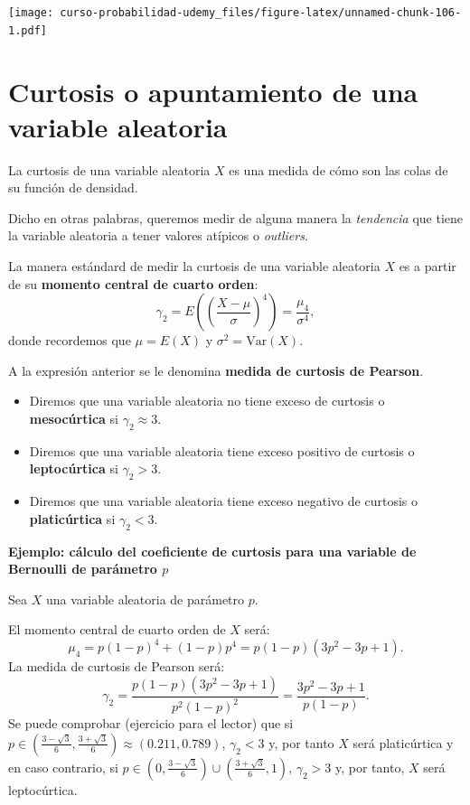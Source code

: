 \documentclass[]{book}
\begin{document}
\texttt{[image: curso-probabilidad-udemy\_files/figure-latex/unnamed-chunk-106-1.pdf]}

\hypertarget{curtosis-o-apuntamiento-de-una-variable-aleatoria}{%
\section{Curtosis o apuntamiento de una variable aleatoria}\label{curtosis-o-apuntamiento-de-una-variable-aleatoria}}

La curtosis de una variable aleatoria \(X\) es una medida de cómo son las colas de su función de densidad.

Dicho en otras palabras, queremos medir de alguna manera la \emph{tendencia} que tiene la variable aleatoria a tener valores atípicos o \emph{outliers}.

La manera estándard de medir la curtosis de una variable aleatoria \(X\) es a partir de su \textbf{momento central de cuarto orden}:
\[
\gamma_2 = E\left(\left(\frac{X-\mu}{\sigma}\right)^4\right) = \frac{\mu_4}{\sigma^4},
\]
donde recordemos que \(\mu=E(X)\) y \(\sigma^2 =\mathrm{Var}(X)\).

A la expresión anterior se le denomina \textbf{medida de curtosis de Pearson}.

\begin{itemize}
\item
  Diremos que una variable aleatoria no tiene exceso de curtosis o \textbf{mesocúrtica} si \(\gamma_2 \approx 3\).
\item
  Diremos que una variable aleatoria tiene exceso positivo de curtosis o \textbf{leptocúrtica} si \(\gamma_2 >3\).
\item
  Diremos que una variable aleatoria tiene exceso negativo de curtosis o \textbf{platicúrtica} si \(\gamma_2 <3\).
\end{itemize}

\textbf{Ejemplo: cálculo del coeficiente de curtosis para una variable de Bernoulli de parámetro \(p\)}

Sea \(X\) una variable aleatoria de parámetro \(p\).

El momento central de cuarto orden de \(X\) será:
\[
\mu_4 = p (1-p)^4 +(1-p)p^4 = p (1-p) (3 p^2-3p+1).
\]
La medida de curtosis de Pearson será:
\[
\gamma_2 = \frac{p (1-p) (3 p^2-3p+1)}{p^2 (1-p)^2} = \frac{3 p^2-3p+1}{p(1-p)}.
\]
Se puede comprobar (ejercicio para el lector) que si \(p\in \left(\frac{3-\sqrt{3}}{6},\frac{3+\sqrt{3}}{6}\right)\approx (0.211,0.789)\), \(\gamma_2 <3\) y, por tanto \(X\) será platicúrtica y en caso contrario, si \(p\in \left(0,\frac{3-\sqrt{3}}{6}\right)\cup \left(\frac{3+\sqrt{3}}{6},1\right)\), \(\gamma_2 >3\) y, por tanto, \(X\) será leptocúrtica.
\end{document}
